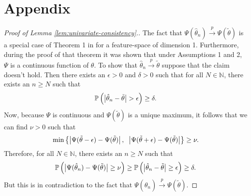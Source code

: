 
\section{Appendix}
\label{sec:appendix}

\begin{proof}[Proof of Lemma \ref{lem:univariate-consistency}.]
  The fact that
  $\Psi(\hat{\theta}_n) \stackrel{p}{\longrightarrow} \Psi(\tilde{\theta})$ is a
  special case of Theorem 1 in \cite{hennig2016} for a feature-space of
  dimension 1.  Furthermore, during the proof of that theorem it was shown that
  under Assumptions 1 and 2, $\Psi$ is a continuous function of $\theta$.  To
  show that $\hat{\theta}_n \stackrel{p}{\longrightarrow} \tilde{\theta}$
  suppose that the claim doesn't hold.  Then there exists an $\epsilon > 0$ and
  $\delta > 0$ such that for all $N \in \mathbb{N}$, there exists an $n \geq N$
  such that
  \begin{equation*}
    \mathbb{P}\,\Big(
    \big| \hat{\theta}_n - \tilde{\theta} \big|
    > \epsilon \Big)
    \geq \delta.
  \end{equation*}
  Now, because $\Psi$ is continuous and $\Psi(\tilde{\theta})$ is a unique
  maximum, it follows that we can find $\nu > 0$ such that
  \begin{equation*}
    \min \left\{
      \big| \Psi(\Tilde{\theta} - \epsilon) - \Psi(\tilde{\theta}) \big|\,,
      \hspace{2mm}
      \big| \Psi(\Tilde{\theta} + \epsilon) - \Psi(\tilde{\theta}) \big|
    \right\} \geq \nu.
  \end{equation*}
  Therefore, for all $N \in \mathbb{N}$, there exists an $n \geq N$ such that
  \begin{equation*}
    \mathbb{P}\,\Big(
    \big| \Psi(\hat{\theta}_n) - \Psi(\tilde{\theta}) \big|
    \geq \nu \Big) \geq
    \mathbb{P}\,\Big(
    \big| \hat{\theta}_n - \tilde{\theta} \big|
    \geq \epsilon \Big)
    \geq \delta.
  \end{equation*}
  But this is in contradiction to the fact that
  $\Psi(\hat{\theta}_n) \stackrel{p}{\longrightarrow} \Psi(\tilde{\theta})$.
\end{proof}


